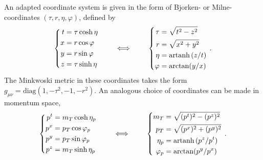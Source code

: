 An adapted coordinate system is given in the form of Bjorken- or Milne-coordinates ${(\tau, r, \eta, \varphi)}$, defined by
\begin{equation}
    \left\{\begin{split}
        t&=\tau\cosh\eta\\
        x&=r\cos\varphi\\
        y&=r\sin\varphi\\
        z&=\tau\sinh\eta
    \end{split}\right.
    \qquad\iff\qquad
    \left\{\begin{split}
        \tau&=\sqrt{t^2-z^2}\\
        r&=\sqrt{x^2+y^2}\\
        \eta&={\text{artanh}\,}(z/t)\\
        \varphi&=\arctan(y/x)
    \end{split}\right.\,.
    \label{eq:BjorkenCoords_PositionSpace}
\end{equation}
The Minkwoski metric in these coordinates takes the form ${g_{\mu\nu}=\text{diag}(1,-\tau^2,-1,-r^2)}$. An analogous choice of coordinates can be made in momentum space,
\begin{equation}
    \left\{
    \begin{split}
        p^t&=m_T\cosh\eta_p\\
        p^x&=p_T\cos\varphi_p\\
        p^y&=p_T\sin\varphi_p\\
        p^z&=m_T\sinh\eta_p
    \end{split}
    \right.\qquad\iff\qquad
    \left\{
    \begin{split}
        m_T&=\sqrt{(p^t)^2-(p^z)^2}\\
        p_T&=\sqrt{(p^x)^2+(p^y)^2}\\
        \eta_p&={\text{artanh}\,}(p^z/p^t)\\
        \varphi_p&=\arctan(p^y/p^x)
    \end{split}
    \right.\,.
    \label{eq:BjorkenCoords_MomentumSpace}
\end{equation}

